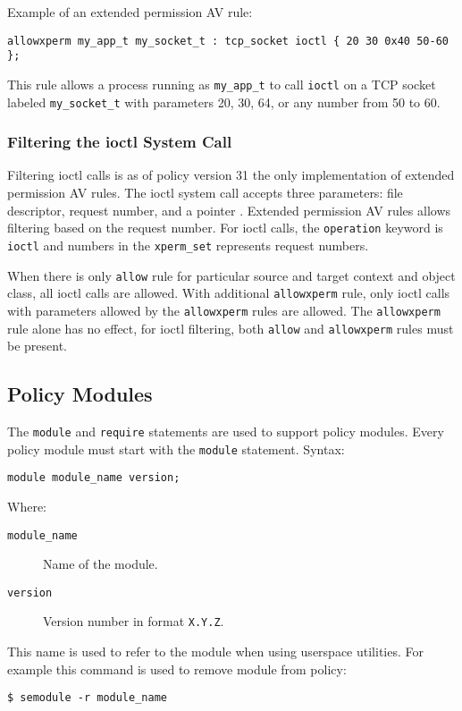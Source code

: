 Example of an extended permission AV rule:
\begin{lstlisting}[language=te]
allowxperm my_app_t my_socket_t : tcp_socket ioctl { 20 30 0x40 50-60 };
\end{lstlisting}
This rule allows a process running as \texttt{my\_app\_t} to call \texttt{ioctl}
on a TCP socket labeled \texttt{my\_socket\_t} with parameters 20, 30, 64, or
any number from 50 to 60.

\subsubsection{Filtering the ioctl System Call}
Filtering ioctl calls is as of policy version 31 the only implementation of
extended permission AV rules. The ioctl system call accepts three parameters:
file descriptor, request number, and a pointer \cite{ioctl}. Extended permission
AV rules allows filtering based on the request number. For ioctl calls, the
\texttt{operation} keyword is \texttt{ioctl} and numbers in the
\texttt{xperm\_set} represents request numbers.

When there is only \texttt{allow} rule for particular source and target context
and object class, all ioctl calls are allowed. With additional
\texttt{allowxperm} rule, only ioctl calls with parameters allowed by the
\texttt{allowxperm} rules are allowed. The \texttt{allowxperm} rule alone has
no effect, for ioctl filtering, both \texttt{allow} and \texttt{allowxperm}
rules must be present.

\subsection{Policy Modules}
\label{modules}

The \texttt{module} and \texttt{require} statements are used to support policy
modules. Every policy module must start with the \texttt{module} statement.
Syntax:
\begin{lstlisting}[language=te]
module module_name version;
\end{lstlisting}
Where:
\begin{description}
    \item [\texttt{module\_name}] Name of the module.
    \item [\texttt{version}] Version number in format \texttt{X.Y.Z}.
\end{description}
This name is used to refer to the module when using userspace utilities. For
example this command is used to remove module from policy:
\begin{lstlisting}
$ semodule -r module_name
\end{lstlisting}

